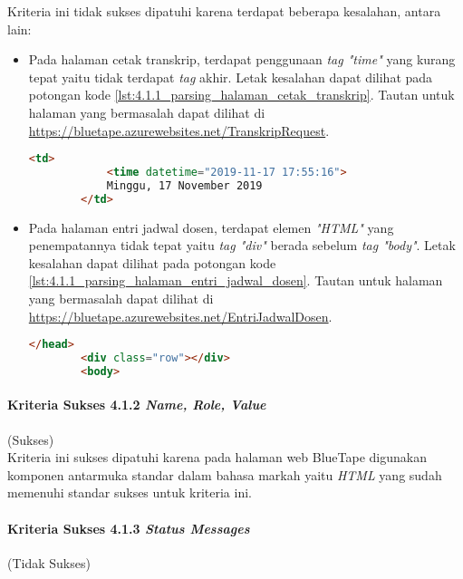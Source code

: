 Kriteria ini tidak sukses dipatuhi karena terdapat beberapa kesalahan, antara lain:

\begin{itemize}
    \item Pada halaman cetak transkrip, terdapat penggunaan \textit{tag "time"} yang kurang tepat yaitu tidak terdapat \textit{tag} akhir. Letak kesalahan dapat dilihat pada potongan kode \ref{lst:4.1.1_parsing_halaman_cetak_transkrip}. Tautan untuk halaman yang bermasalah dapat dilihat di \url{https://bluetape.azurewebsites.net/TranskripRequest}.
    \begin{lstlisting}[frame=single, label={lst:4.1.1_parsing_halaman_cetak_transkrip}, language=HTML, caption=Kriteria Sukses 4.1.1 - Kesalahan Elemen pada Halaman Cetak Transkrip]
        <td>
            <time datetime="2019-11-17 17:55:16">
            Minggu, 17 November 2019
        </td>
    \end{lstlisting}

    \item Pada halaman entri jadwal dosen, terdapat elemen \textit{"HTML"} yang penempatannya tidak tepat yaitu \textit{tag "div"} berada sebelum \textit{tag "body"}. Letak kesalahan dapat dilihat pada potongan kode \ref{lst:4.1.1_parsing_halaman_entri_jadwal_dosen}. Tautan untuk halaman yang bermasalah dapat dilihat di \url{https://bluetape.azurewebsites.net/EntriJadwalDosen}.
    \begin{lstlisting}[frame=single, label={lst:4.1.1_parsing_halaman_entri_jadwal_dosen}, language=HTML, caption=Kriteria Sukses 4.1.1 - Kesalahan Elemen pada Halaman Entri Jadwal Dosen]
        </head>
        <div class="row"></div>        
        <body>
    \end{lstlisting}
\end{itemize}

\paragraph{Kriteria Sukses 4.1.2 \textit{Name, Role, Value}}
\label{par:kepatuhan_bluetape_kriteria_sukses_4.1.2}
(Sukses)\\

Kriteria ini sukses dipatuhi karena pada halaman web BlueTape digunakan komponen antarmuka standar dalam bahasa markah yaitu \textit{HTML} yang sudah memenuhi standar sukses untuk kriteria ini.

\paragraph{Kriteria Sukses 4.1.3 \textit{Status Messages}}
\label{par:kepatuhan_bluetape_kriteria_sukses_4.1.3}
(Tidak Sukses)\\

